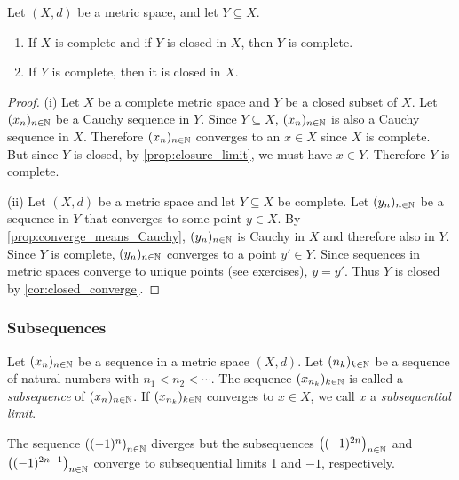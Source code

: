 \documentclass{article}
\begin{document}
\begin{proposition}
\label{prop:closed_subset_complete}
Let $(X, d)$ be a metric space, and let $Y\subseteq X$.
\begin{enumerate}
    \item[(i)] If $X$ is complete and if $Y$ is closed in $X$, then $Y$ is complete.
    \item[(ii)] If $Y$ is complete, then it is closed in $X$.
\end{enumerate}
\end{proposition}

\begin{proof}
(i) Let $X$ be a complete metric space and $Y$ be a closed subset of $X$. Let $(x_n)_{n\in{\mathbb{N}}}$ be a Cauchy sequence in $Y$. Since $Y \subseteq X$, $(x_n)_{n\in{\mathbb{N}}}$ is also a Cauchy sequence in $X$. Therefore $(x_n)_{n\in{\mathbb{N}}}$ converges to an $x \in X$ since $X$ is complete. But since $Y$ is closed, by \cref{prop:closure_limit}, we must have $x \in Y$. Therefore $Y$ is complete.

(ii) Let $(X, d)$ be a metric space and let $Y\subseteq X$ be complete. Let $(y_n)_{n\in{\mathbb{N}}}$ be a sequence in $Y$ that converges to some point $y \in X$.  By \cref{prop:converge_means_Cauchy},  $(y_n)_{n\in{\mathbb{N}}}$ is Cauchy in $X$ and therefore also in $Y$. Since $Y$ is complete, $(y_n)_{n\in{\mathbb{N}}}$ converges to a point $y' \in Y$. Since sequences in metric spaces converge to unique points (see exercises), $y=y'$. Thus $Y$ is closed by \cref{cor:closed_converge}.
\end{proof}

\subsubsection{Subsequences}

\begin{definition}
Let $(x_n)_{n \in {\mathbb{N}}}$ be a sequence in a metric space $(X,d)$. Let $(n_k)_{k \in {\mathbb{N}}}$ be a sequence of natural numbers with $n_1 < n_2 < \cdots$. The sequence $(x_{n_k})_{k \in {\mathbb{N}}}$ is called a \emph{subsequence} of $(x_n)_{n \in {\mathbb{N}}}$. If $(x_{n_k})_{k \in {\mathbb{N}}}$ converges to $x \in X$, we call $x$ a \emph{subsequential limit}.
\end{definition}

\begin{example}
The sequence $\left((-1)^n\right)_{n \in {\mathbb{N}}}$ diverges but the subsequences $\left((-1)^{2n}\right)_{n \in {\mathbb{N}}}$ and $\left((-1)^{2n-1}\right)_{n\in {\mathbb{N}}}$ converge to subsequential limits 1 and $-1$, respectively.
\end{example}
\end{document}
